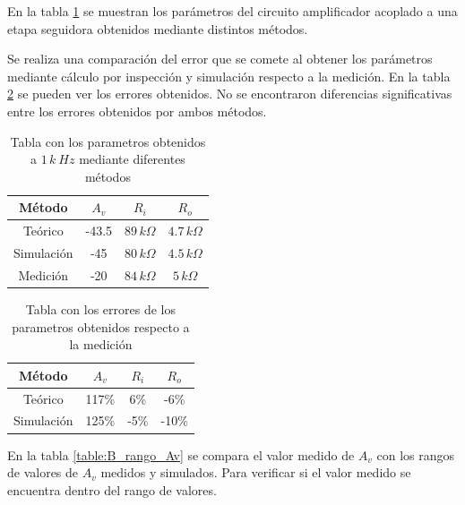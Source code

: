 \documentclass[10pt,spanish,a4paper,notitlepage]{article}
\begin{document}
En la tabla \ref{table:B_comparacion_parametros} se muestran los parámetros
del circuito amplificador acoplado a una etapa seguidora obtenidos mediante
distintos métodos.

Se realiza una comparación del error que se comete al obtener los parámetros
mediante cálculo por inspección y simulación respecto a la medición. En la
tabla \ref{table:B_error_parametros} se pueden ver los errores obtenidos.
No se encontraron diferencias significativas entre los errores obtenidos
por ambos métodos.

\begin{table}[H]
\centering
\begin{tabular}{|c|c|c|c|} %
\hline
Método & $A_v$ & $R_i$  & $R_o$ \\ \hline
Teórico & -43.5 & $89\,\unit{k\Omega}$  & $4.7\,\unit{k\Omega}$   \\ \hline
Simulación & -45 & $80\,\unit{k\Omega}$  & $4.5\,\unit{k\Omega}$   \\ \hline
Medición & -20 & $84\,\unit{k\Omega}$  & $5\,\unit{k\Omega}$   \\ \hline
\end{tabular}
\caption{Tabla con los parametros obtenidos a $1\,\unit{k\ Hz}$ mediante diferentes métodos}
\label{table:B_comparacion_parametros}
\end{table}


\begin{table}[H]
\centering
\begin{tabular}{|c|c|c|c|} %
\hline
Método & $A_v$ & $R_i$  & $R_o$ \\ \hline
Teórico & 117\% & 6\%  & -6\%  \\ \hline
Simulación & 125\% & -5\%  & -10\%  \\ \hline
\end{tabular}
\caption{Tabla con los errores de los parametros obtenidos respecto a la medición}
\label{table:B_error_parametros}
\end{table}

En la tabla \ref{table:B_rango_Av} se compara el valor medido de $A_v$ con los rangos de valores de $A_v$
medidos y simulados. Para verificar si el valor medido se encuentra dentro del rango de valores.
\end{document}
